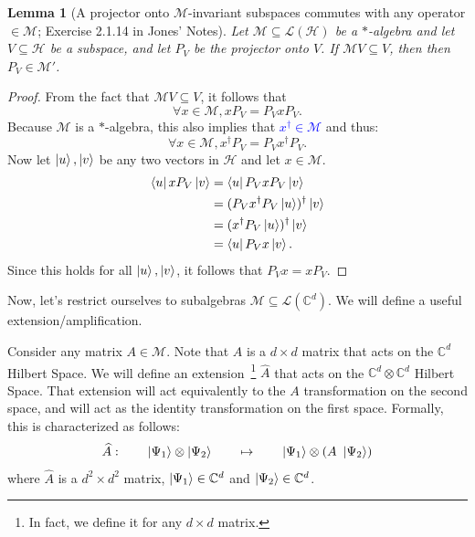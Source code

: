 \documentclass[12pt]{article}
\theoremstyle{plain}
\newtheorem{lemma}[theorem]{Lemma}
\newcommand{\Wheels}[1]{\textcolor{blue}{#1}}
\begin{document}

\begin{lemma}[A projector onto $\mathcal{M}$-invariant subspaces commutes with any operator $\in \mathcal{M}$; Exercise 2.1.14 in Jones' Notes]
\label{ex-2-1-14}
    Let $\mathcal{M} \subseteq \mathcal{L}(\mathcal{H})$ be a $*$-algebra and let $V \subseteq \mathcal{H}$ be a subspace, and let $P_V$ be the projector onto $V$. If $\mathcal{M}V \subseteq V$, then then $P_V \in \mathcal{M}'$.
\end{lemma}
\begin{proof}
    From the fact that $\mathcal{M}V \subseteq V$, it follows that
    \[ \forall x \in \mathcal{M}, x P_V = P_V x P_V.\]
    Because $\mathcal{M}$ is a $*$-algebra, this also implies that \Wheels{$x^\dagger \in \mathcal{M}$} and thus:
    \[ \forall x \in \mathcal{M}, x^\dagger P_V = P_V x^\dagger P_V.\]
    Now let $\ket{u}, \ket{v}$ be any two vectors in $\mathcal{H}$ and let $x \in \mathcal{M}$.
    \begin{align}
        \bra{u} x P_V \ket{v} &= \bra{u} P_V x P_V \ket{v} \\
        &= (P_V x^\dagger P_V \ket{u} )^\dagger \ket{v} \\
        &= (x^\dagger P_V \ket{u})^\dagger \ket{v} \\
        &= \bra{u} P_V x \ket{v}.
    \end{align}
    Since this holds for all $\ket{u}, \ket{v}$, it follows that $P_V x = xP_V$.
\end{proof}

Now, let's restrict ourselves to subalgebras $\mathcal{M} \subseteq \mathcal{L}(\mathbb{C}^d)$. We will define a useful extension/amplification.

Consider any matrix $A \in \mathcal{M}$. Note that $A$ is a $d \times d$ matrix that acts on the $\mathbb{C}^d$ Hilbert Space. We will define an extension~\footnote{In fact, we define it for any $d \times d$ matrix.} $\widehat{A}$ that acts on the $\mathbb{C}^d \otimes \mathbb{C}^d$ Hilbert Space. That extension will act equivalently to the $A$ transformation on the second space, and will act as the identity transformation on the first space. Formally, this is characterized as follows:
    \begin{equation}
        \widehat{A}: \quad\quad\ket{\Psi_1} \otimes \ket{\Psi_2} \quad\quad \mapsto  \quad\quad \ket{\Psi_1} \otimes \left(A \ \ket{\Psi_2}\right)
    \end{equation}
where $\widehat{A}$ is a $d^2 \times d^2$ matrix, $\ket{\Psi_1} \in \mathbb{C}^d$ and $\ket{\Psi_2} \in \mathbb{C}^d$.
\end{document}
